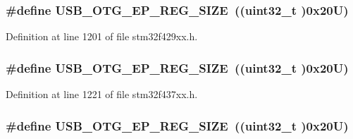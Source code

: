 \subsubsection[{\texorpdfstring{U\+S\+B\+\_\+\+O\+T\+G\+\_\+\+E\+P\+\_\+\+R\+E\+G\+\_\+\+S\+I\+ZE}{USB_OTG_EP_REG_SIZE}}]{\setlength{\rightskip}{0pt plus 5cm}\#define U\+S\+B\+\_\+\+O\+T\+G\+\_\+\+E\+P\+\_\+\+R\+E\+G\+\_\+\+S\+I\+ZE~((uint32\+\_\+t )0x20\+U)}\hypertarget{group___peripheral__memory__map_ga6fdb7429ad88e2d69440d6ecc4f4199e}{}\label{group___peripheral__memory__map_ga6fdb7429ad88e2d69440d6ecc4f4199e}


Definition at line 1201 of file stm32f429xx.\+h.

\subsubsection[{\texorpdfstring{U\+S\+B\+\_\+\+O\+T\+G\+\_\+\+E\+P\+\_\+\+R\+E\+G\+\_\+\+S\+I\+ZE}{USB_OTG_EP_REG_SIZE}}]{\setlength{\rightskip}{0pt plus 5cm}\#define U\+S\+B\+\_\+\+O\+T\+G\+\_\+\+E\+P\+\_\+\+R\+E\+G\+\_\+\+S\+I\+ZE~((uint32\+\_\+t )0x20\+U)}\hypertarget{group___peripheral__memory__map_ga6fdb7429ad88e2d69440d6ecc4f4199e}{}\label{group___peripheral__memory__map_ga6fdb7429ad88e2d69440d6ecc4f4199e}


Definition at line 1221 of file stm32f437xx.\+h.

\subsubsection[{\texorpdfstring{U\+S\+B\+\_\+\+O\+T\+G\+\_\+\+E\+P\+\_\+\+R\+E\+G\+\_\+\+S\+I\+ZE}{USB_OTG_EP_REG_SIZE}}]{\setlength{\rightskip}{0pt plus 5cm}\#define U\+S\+B\+\_\+\+O\+T\+G\+\_\+\+E\+P\+\_\+\+R\+E\+G\+\_\+\+S\+I\+ZE~((uint32\+\_\+t )0x20\+U)}\hypertarget{group___peripheral__memory__map_ga6fdb7429ad88e2d69440d6ecc4f4199e}{}\label{group___peripheral__memory__map_ga6fdb7429ad88e2d69440d6ecc4f4199e}


